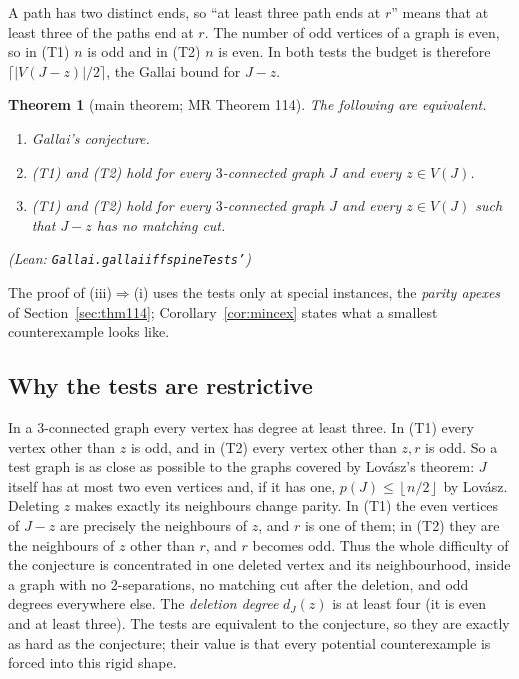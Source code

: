 \documentclass[11pt]{amsart}
\newtheorem{theorem}{Theorem}[section]
\theoremstyle{definition}
\theoremstyle{remark}
\renewcommand{\_}{\oldunderscore\allowbreak}
\newcommand{\leanst}[1]{\par{\raggedright\small\textup{(Lean: \texttt{#1})}\par}}
\newcommand{\fl}[1]{\left\lfloor #1\right\rfloor}
\begin{document}
A path has two distinct ends, so ``at least three path ends at $r$'' means that at least three of
the paths end at $r$. The number of odd vertices of a graph is even, so in (T1) $n$ is odd and in
(T2) $n$ is even. In both tests the budget is therefore $\lceil |V(J-z)|/2\rceil$, the Gallai bound
for $J-z$.

\begin{theorem}[main theorem; MR Theorem 114]\label{thm:main}
The following are equivalent.
\begin{enumerate}[label=\textup{(\roman*)}]
\item Gallai's conjecture.
\item \textup{(T1)} and \textup{(T2)} hold for every $3$-connected graph $J$ and every
$z\in V(J)$.
\item \textup{(T1)} and \textup{(T2)} hold for every $3$-connected graph $J$ and every
$z\in V(J)$ such that $J-z$ has no matching cut.
\end{enumerate}
\leanst{Gallai.gallai\_iff\_spineTests'}
\end{theorem}

The proof of (iii)$\Rightarrow$(i) uses the tests only at special instances, the \emph{parity
apexes} of Section~\ref{sec:thm114}; Corollary~\ref{cor:mincex} states what a smallest
counterexample looks like.

\subsection*{Why the tests are restrictive}
In a $3$-connected graph every vertex has degree at least three. In (T1) every vertex other than $z$
is odd, and in (T2) every vertex other than $z,r$ is odd. So a test graph is as close as possible to
the graphs covered by Lov\'asz's theorem: $J$ itself has at most two even vertices and, if it has
one, $p(J)\le\fl{n/2}$ by Lov\'asz. Deleting $z$ makes exactly its neighbours change parity. In
(T1) the even vertices of $J-z$ are precisely the neighbours of $z$, and $r$ is one of them; in (T2)
they are the neighbours of $z$ other than $r$, and $r$ becomes odd. Thus the whole difficulty of the
conjecture is concentrated in one deleted vertex and its neighbourhood, inside a graph with no
$2$-separations, no matching cut after the deletion, and odd degrees everywhere else. The
\emph{deletion degree} $d_J(z)$ is at least four (it is even and at least three). The tests are
equivalent to the conjecture, so they are exactly as hard as the conjecture; their value is that
every potential counterexample is forced into this rigid shape.
\end{document}

